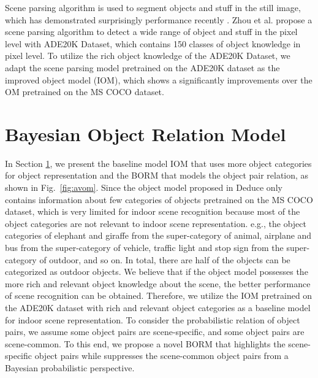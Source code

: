 \documentclass[letterpaper, 10 pt, conference]{ieeeconf}  %
\begin{document}
Scene parsing algorithm is used to segment objects and stuff in the still image, which has demonstrated surprisingly performance recently \cite{Zhou2017}. Zhou et al. \cite{Zhou2019} propose a scene parsing algorithm to detect a wide range of object and stuff in the pixel level with ADE20K Dataset, which contains 150 classes of object knowledge in pixel level. To utilize the rich object knowledge of the ADE20K Dataset, we adapt the scene parsing model pretrained on the ADE20K dataset as the improved object model (IOM), which shows a significantly improvements over the OM pretrained on the MS COCO dataset. 



\section{Bayesian Object Relation Model}
\label{sec:method}

In Section \ref{sec:method}, we present the baseline model IOM that uses more object categories for object representation and the BORM that models the object pair relation, as shown in Fig.~\ref{fig:avom}. Since the object model proposed in Deduce \cite{pal2019deduce} only contains information about few categories of objects pretrained on the MS COCO dataset, which is very limited for indoor scene recognition because most of the object categories are not relevant to indoor scene representation. e.g.,  the object categories of elephant and giraffe from the super-category of animal, airplane and bus from the super-category of vehicle, traffic light and stop sign from the super-category of outdoor, and so on. In total, there are half of the objects can be categorized as outdoor objects. We believe that if the object model possesses the more rich and relevant object knowledge about the scene, the better performance of scene recognition can be obtained. Therefore, we utilize the IOM pretrained on the ADE20K dataset with rich and relevant object categories as a baseline model for indoor scene representation. To consider the probabilistic relation of object pairs, we assume some object pairs are scene-specific, and some object pairs are scene-common. To this end, we propose a novel BORM that highlights the scene-specific object pairs while suppresses the scene-common object pairs from a Bayesian probabilistic perspective.
\end{document}
